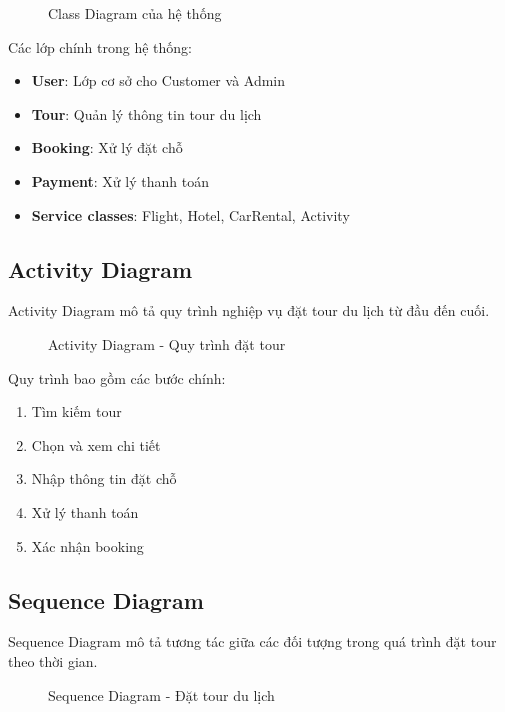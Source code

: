 \documentclass[12pt,a4paper]{article}
\begin{document}
\begin{figure}[H]
    \centering
    
    \caption{Class Diagram của hệ thống}
    \label{fig:class_diagram}
\end{figure}

Các lớp chính trong hệ thống:
\begin{itemize}
    \item \textbf{User}: Lớp cơ sở cho Customer và Admin
    \item \textbf{Tour}: Quản lý thông tin tour du lịch
    \item \textbf{Booking}: Xử lý đặt chỗ
    \item \textbf{Payment}: Xử lý thanh toán
    \item \textbf{Service classes}: Flight, Hotel, CarRental, Activity
\end{itemize}

\subsection{Activity Diagram}

Activity Diagram mô tả quy trình nghiệp vụ đặt tour du lịch từ đầu đến cuối.

\begin{figure}[H]
    \centering
    
    \caption{Activity Diagram - Quy trình đặt tour}
    \label{fig:activity_diagram}
\end{figure}

Quy trình bao gồm các bước chính:
\begin{enumerate}
    \item Tìm kiếm tour
    \item Chọn và xem chi tiết
    \item Nhập thông tin đặt chỗ
    \item Xử lý thanh toán
    \item Xác nhận booking
\end{enumerate}

\subsection{Sequence Diagram}

Sequence Diagram mô tả tương tác giữa các đối tượng trong quá trình đặt tour theo thời gian.

\begin{figure}[H]
    \centering
    
    \caption{Sequence Diagram - Đặt tour du lịch}
    \label{fig:sequence_diagram}
\end{figure}
\end{document}
